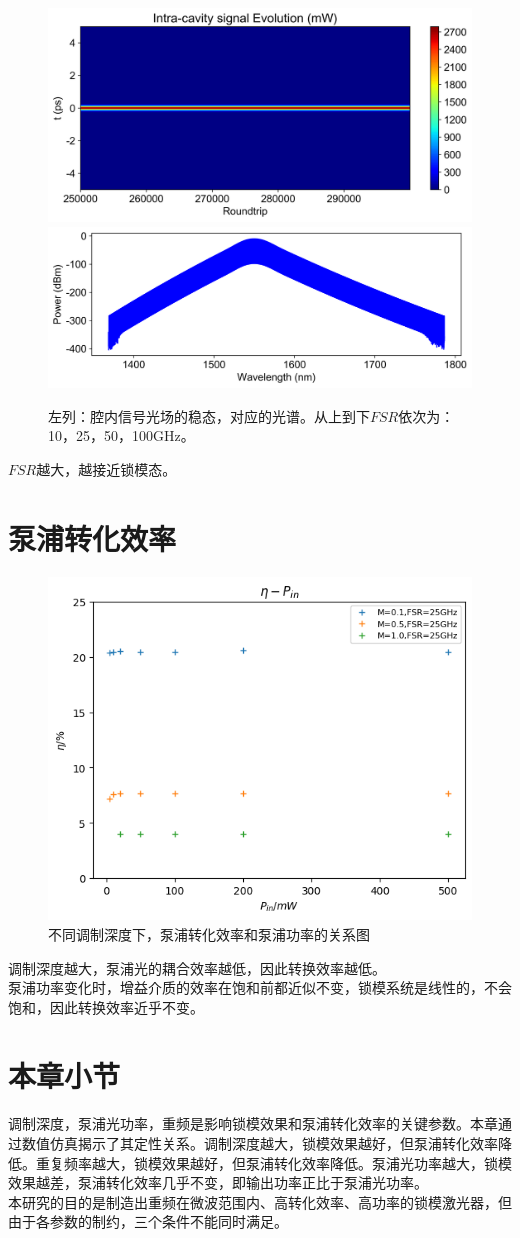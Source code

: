 \begin{figure}[htbp]
    \includegraphics[width=0.48\linewidth]{figure/fig_24.png}
    \includegraphics[width=0.48\linewidth]{figure/fig_24_0.png}
    \caption{左列：腔内信号光场的稳态，对应的光谱。从上到下$FSR$依次为：10，25，50，100GHz。}
    \label{fig:enter-label}
\end{figure}
$FSR$越大，越接近锁模态。
\section{泵浦转化效率}
\begin{figure}[htbp]
    \centering
    \includegraphics[width=0.99\linewidth]{figure/fig_25.png}
    \caption{不同调制深度下，泵浦转化效率和泵浦功率的关系图}
    \label{fig:enter-label}
\end{figure}
调制深度越大，泵浦光的耦合效率越低，因此转换效率越低。\\
泵浦功率变化时，增益介质的效率在饱和前都近似不变，锁模系统是线性的，不会饱和，因此转换效率近乎不变。\\
\section{本章小节}
调制深度，泵浦光功率，重频是影响锁模效果和泵浦转化效率的关键参数。本章通过数值仿真揭示了其定性关系。调制深度越大，锁模效果越好，但泵浦转化效率降低。重复频率越大，锁模效果越好，但泵浦转化效率降低。泵浦光功率越大，锁模效果越差，泵浦转化效率几乎不变，即输出功率正比于泵浦光功率。\\
本研究的目的是制造出重频在微波范围内、高转化效率、高功率的锁模激光器，但由于各参数的制约，三个条件不能同时满足。
